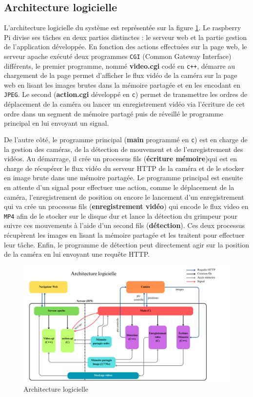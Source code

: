 \documentclass[a4paper, 11pt, french]{article}
\begin{document}
\subsection{Architecture logicielle}
L'architecture logicielle du système est représentée sur la figure \ref{fig:architectureLogicielle}. Le raspberry Pi divise ses tâches en deux parties distinctes : le serveur web et la partie gestion de l'application développée. En fonction des actions effectuées sur la page web, le serveur apache exécuté deux programmes \texttt{CGI} (Common Gateway Interface) différents, le premier programme, nommé \textbf{video.cgi} codé en \texttt{c++}, démarre au chargement de la page permet d'afficher le flux vidéo de la caméra sur la page web en lisant les images brutes dans la mémoire partagée et en les encodant en \texttt{JPEG}. Le second (\textbf{action.cgi} développé en \texttt{c}) permet de transmettre les ordres de déplacement de la caméra ou lancer un enregistrement vidéo via l'écriture de cet ordre dans un segment de mémoire partagé puis de réveillé le programme principal en lui envoyant un signal. 


De l'autre côté, le programme principal (\textbf{main} programmé en \texttt{c}) est en charge de la gestion des caméras, de la détection de mouvement et de l'enregistrement des vidéos. Au démarrage, il crée un processus fils (\textbf{écriture mémoire})qui est en charge de récupérer le flux vidéo du serveur HTTP de la caméra et de le stocker en image brute dans une mémoire partagée. Le programme principal est ensuite en attente d'un signal pour effectuer une action, comme le déplacement de la caméra, l'enregistrement de position ou encore le lancement d'un enregistrement qui va crée un processus fils (\textbf{enregistrement vidéo}) qui encode le flux video en \texttt{MP4} afin de le stocker sur le disque dur et lance la détection du grimpeur pour suivre ces mouvements à l'aide d'un second fils (\textbf{détection}). Ces deux processus récupèrent les images en lisant la mémoire partagée et les traitent pour effectuer leur tâche. Enfin, le programme de détection peut directement agir sur la position de la caméra en lui envoyant une requête HTTP.


\begin{figure}[!ht]
  \centering
  \includegraphics[width=\textwidth]{architectureLogicielle.png}
  \caption{Architecture logicielle}
  \label{fig:architectureLogicielle}
\end{figure}
\end{document}
